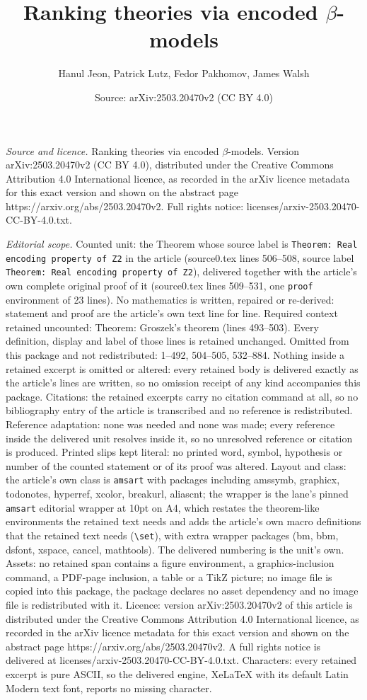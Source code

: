 \documentclass[10pt,a4paper]{amsart}
\title[Ranking theories via encoded $\beta$-models]{Ranking theories via encoded $\beta$-models}
\author{Hanul Jeon, Patrick Lutz, Fedor Pakhomov, James Walsh}
\date{Source: arXiv:2503.20470v2 (CC BY 4.0)}
\begin{document}
\maketitle

\noindent\emph{Source and licence.} Ranking theories via encoded $\beta$-models. Version arXiv:2503.20470v2 (CC BY 4.0), distributed under the Creative Commons Attribution 4.0 International licence, as recorded in the arXiv licence metadata for this exact version and shown on the abstract page https://arxiv.org/abs/2503.20470v2. Full rights notice: licenses/arxiv-2503.20470-CC-BY-4.0.txt.\par\smallskip

\noindent\textit{Editorial scope.} Counted unit: the Theorem whose source label is \texttt{Theorem: Real encoding property of Z2} in the article (source0.tex lines 506--508, source label \texttt{Theorem: Real encoding property of Z2}), delivered together with the article's own complete original proof of it (source0.tex lines 509--531, one \texttt{proof} environment of 23 lines). No mathematics is written, repaired or re-derived: statement and proof are the article's own text line for line. Required context retained uncounted: Theorem: Groszek's theorem (lines 493--503). Every definition, display and label of those lines is retained unchanged. Omitted from this package and not redistributed: 1--492, 504--505, 532--884. Nothing inside a retained excerpt is omitted or altered: every retained body is delivered exactly as the article's lines are written, so no omission receipt of any kind accompanies this package. Citations: the retained excerpts carry no citation command at all, so no bibliography entry of the article is transcribed and no reference is redistributed. Reference adaptation: none was needed and none was made; every reference inside the delivered unit resolves inside it, so no unresolved reference or citation is produced. Printed slips kept literal: no printed word, symbol, hypothesis or number of the counted statement or of its proof was altered. Layout and class: the article's own class is \texttt{amsart} with packages including amssymb, graphicx, todonotes, hyperref, xcolor, breakurl, aliascnt; the wrapper is the lane's pinned \texttt{amsart} editorial wrapper at 10pt on A4, which restates the theorem-like environments the retained text needs and adds the article's own macro definitions that the retained text needs (\texttt{\textbackslash set}), with extra wrapper packages (bm, bbm, dsfont, xspace, cancel, mathtools). The delivered numbering is the unit's own. Assets: no retained span contains a figure environment, a graphics-inclusion command, a PDF-page inclusion, a table or a TikZ picture; no image file is copied into this package, the package declares no asset dependency and no image file is redistributed with it. Licence: version arXiv:2503.20470v2 of this article is distributed under the Creative Commons Attribution 4.0 International licence, as recorded in the arXiv licence metadata for this exact version and shown on the abstract page https://arxiv.org/abs/2503.20470v2. A full rights notice is delivered at licenses/arxiv-2503.20470-CC-BY-4.0.txt. Characters: every retained excerpt is pure ASCII, so the delivered engine, XeLaTeX with its default Latin Modern text font, reports no missing character.
\end{document}
